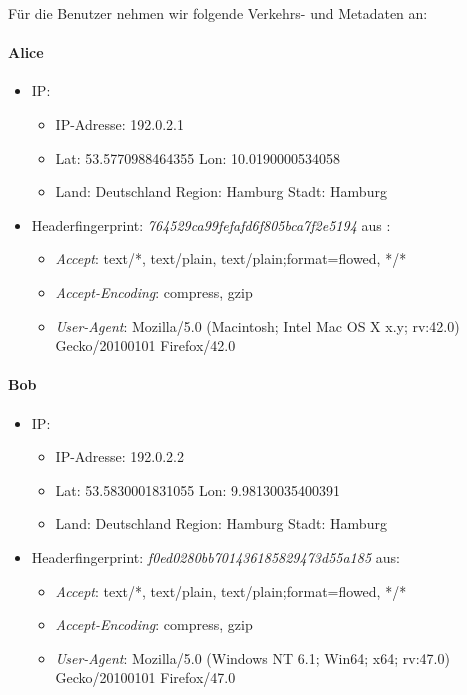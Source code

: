 \documentclass[
    fontsize=12pt,
    headings=small,
    parskip=half,           %
    bibliography=totoc,
    numbers=noenddot,       %
    open=any,               %
    ]{scrreprt}
\begin{document}
Für die Benutzer nehmen wir folgende Verkehrs- und Metadaten an: 
\paragraph{Alice}
\begin{itemize}
  \item IP: 
  \begin{itemize}
  \item IP-Adresse: 192.0.2.1
  \item Lat: 53.5770988464355 Lon: 10.0190000534058
  \item Land: Deutschland Region: Hamburg Stadt: Hamburg
  \end{itemize}
  \item Headerfingerprint: \textit{764529ca99fefafd6f805bca7f2e5194} aus :
  \begin{itemize}
  \item \textit{Accept}: text/*, text/plain, text/plain;format=flowed, */*
  \item \textit{Accept-Encoding}: compress, gzip
  \item \textit{User-Agent}: Mozilla/5.0 (Macintosh; Intel Mac OS X x.y; rv:42.0) Gecko/20100101 Firefox/42.0
  \end{itemize}
\end{itemize}

\paragraph{Bob}
\begin{itemize}
  \item IP: 
  \begin{itemize}
  \item IP-Adresse: 192.0.2.2
  \item Lat: 53.5830001831055 Lon: 9.98130035400391
  \item Land: Deutschland Region: Hamburg Stadt: Hamburg
  \end{itemize}
  \item Headerfingerprint: \textit{f0ed0280bb701436185829473d55a185} aus:
  \begin{itemize}
  \item \textit{Accept}: text/*, text/plain, text/plain;format=flowed, */*
  \item \textit{Accept-Encoding}: compress, gzip
  \item \textit{User-Agent}: Mozilla/5.0 (Windows NT 6.1; Win64; x64; rv:47.0) Gecko/20100101 Firefox/47.0
  \end{itemize}
\end{itemize}
\end{document}
